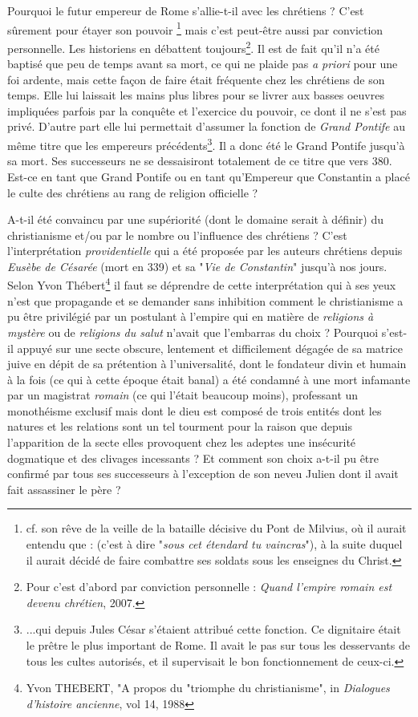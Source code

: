 Pourquoi le futur empereur de Rome s'allie-t-il avec les chrétiens ? 
C'est sûrement pour étayer son pouvoir \footnote{cf. son rêve de la veille de la bataille décisive du Pont de Milvius, où il aurait entendu que :  (c'est à dire "\emph{sous cet étendard tu vaincras}"), à la suite duquel il aurait décidé de faire combattre ses soldats sous les enseignes du Christ.} mais c'est peut-être aussi par conviction personnelle. Les historiens en débattent toujours\footnote{Pour  c'est d'abord par conviction personnelle : \emph{Quand l'empire romain est devenu chrétien}, 2007.}. Il est de fait qu'il n'a été baptisé que peu de temps avant sa mort, ce qui ne plaide pas \emph{a priori} pour une foi ardente, mais cette façon de faire était fréquente chez les chrétiens de son temps. Elle lui laissait les mains plus libres pour se livrer aux basses oeuvres impliquées parfois par la conquête et l'exercice du pouvoir, ce dont il ne s'est pas privé. D'autre part elle lui permettait d'assumer la fonction de \emph{Grand Pontife} au même titre que les empereurs précédents\footnote{...qui depuis Jules César s'étaient attribué cette fonction. Ce dignitaire était le prêtre le plus important de Rome. Il avait le pas sur tous les desservants de tous les cultes autorisés, et il supervisait le bon fonctionnement de ceux-ci.}. Il a donc été le Grand Pontife jusqu'à sa mort. Ses successeurs ne se dessaisiront totalement de ce titre que vers 380. Est-ce en tant que Grand Pontife ou en tant qu'Empereur que Constantin a placé le culte des chrétiens au rang de religion officielle ? 

A-t-il été convaincu par une supériorité (dont le domaine serait à définir) du christianisme et/ou par le nombre ou l'influence des chrétiens ? C'est l'interprétation \emph{providentielle} qui a été proposée par les auteurs chrétiens depuis \emph{Eusèbe de Césarée} (mort en 339) et sa "\emph{Vie de Constantin}" jusqu'à nos jours. Selon Yvon Thébert\footnote{Yvon THEBERT, "A propos du "triomphe du christianisme", in \emph{Dialogues d'histoire ancienne}, vol 14, 1988} il faut se déprendre de cette interprétation qui à ses yeux n'est que propagande et se demander sans inhibition comment le christianisme a pu être privilégié par un postulant à l'empire qui en matière de \emph{religions à mystère} ou de \emph{religions du salut} n'avait que l'embarras du choix ? Pourquoi s'est-il appuyé sur une secte obscure, lentement et difficilement dégagée de sa matrice juive en dépit de sa prétention à l'universalité, dont le fondateur divin et humain à la fois (ce qui à cette époque était banal) a été condamné à une mort infamante par un magistrat \emph{romain} (ce qui l'était beaucoup moins), professant un monothéisme exclusif mais dont le dieu est composé de trois entités dont les natures et les relations sont un tel tourment pour la raison que depuis l'apparition de la secte elles provoquent chez les adeptes une insécurité dogmatique et des clivages incessants ?  Et comment son choix a-t-il pu être confirmé par tous ses successeurs à l'exception de son neveu Julien dont il avait fait assassiner le père ?  

